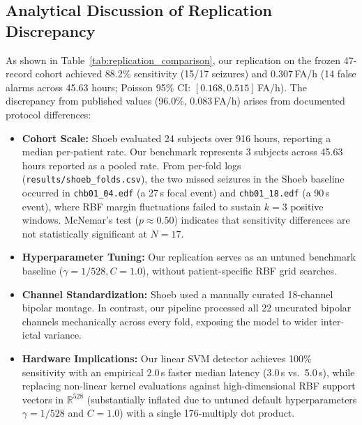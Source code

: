 \documentclass[10pt,twocolumn,letterpaper]{article}
\begin{document}
\begin{table}[t]
\centering
\footnotesize
\caption{Benchmark replication comparison: Shoeb \& Guttag vs.\ proposed DWT + Linear SVM under identical LORO evaluation.}
\label{tab:replication_comparison}
\end{table}

\subsection{Analytical Discussion of Replication Discrepancy}

As shown in Table~\ref{tab:replication_comparison}, our replication on the frozen 47-record cohort achieved 88.2\% sensitivity (15/17 seizures) and 0.307\,FA/h (14 false alarms across 45.63 hours; Poisson 95\% CI: $[0.168, 0.515]$\,FA/h). The discrepancy from published values (96.0\%, 0.083\,FA/h) arises from documented protocol differences:
\begin{itemize}
    \item \textbf{Cohort Scale:} Shoeb evaluated 24 subjects over 916 hours, reporting a median per-patient rate. Our benchmark represents 3 subjects across 45.63 hours reported as a pooled rate. From per-fold logs (\texttt{results/shoeb\_folds.csv}), the two missed seizures in the Shoeb baseline occurred in \texttt{chb01\_04.edf} (a 27\,s focal event) and \texttt{chb01\_18.edf} (a 90\,s event), where RBF margin fluctuations failed to sustain $k=3$ positive windows. McNemar's test ($p \approx 0.50$) indicates that sensitivity differences are not statistically significant at $N=17$.
    \item \textbf{Hyperparameter Tuning:} Our replication serves as an untuned benchmark baseline ($\gamma = 1/528, C=1.0$), without patient-specific RBF grid searches.
    \item \textbf{Channel Standardization:} Shoeb used a manually curated 18-channel bipolar montage. In contrast, our pipeline processed all 22 uncurated bipolar channels mechanically across every fold, exposing the model to wider inter-ictal variance.
    \item \textbf{Hardware Implications:} Our linear SVM detector achieves 100\% sensitivity with an empirical 2.0\,s faster median latency (3.0\,s vs.\ 5.0\,s), while replacing non-linear kernel evaluations against high-dimensional RBF support vectors in $\mathbb{R}^{528}$ (substantially inflated due to untuned default hyperparameters $\gamma = 1/528$ and $C=1.0$) with a single 176-multiply dot product.
\end{itemize}
\end{document}
